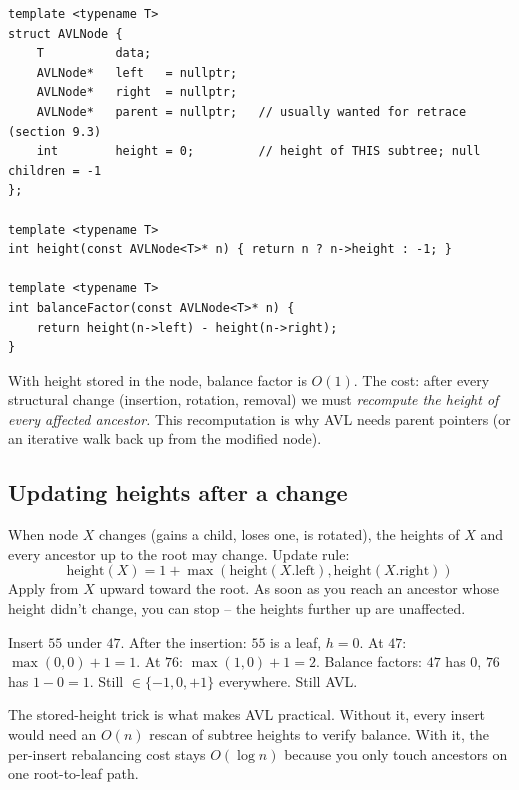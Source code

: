 \documentclass[11pt]{article}
\begin{document}
\begin{lstlisting}
template <typename T>
struct AVLNode {
    T          data;
    AVLNode*   left   = nullptr;
    AVLNode*   right  = nullptr;
    AVLNode*   parent = nullptr;   // usually wanted for retrace (section 9.3)
    int        height = 0;         // height of THIS subtree; null children = -1
};

template <typename T>
int height(const AVLNode<T>* n) { return n ? n->height : -1; }

template <typename T>
int balanceFactor(const AVLNode<T>* n) {
    return height(n->left) - height(n->right);
}
\end{lstlisting}

With height stored in the node, balance factor is $O(1)$. The cost: after every structural change (insertion, rotation, removal) we must \emph{recompute the height of every affected ancestor.} This recomputation is why AVL needs parent pointers (or an iterative walk back up from the modified node).

\subsection*{Updating heights after a change}

When node $X$ changes (gains a child, loses one, is rotated), the heights of $X$ and every ancestor up to the root may change. Update rule:
\[
\text{height}(X) = 1 + \max(\text{height}(X.\text{left}), \text{height}(X.\text{right}))
\]
Apply from $X$ upward toward the root. As soon as you reach an ancestor whose height didn't change, you can stop -- the heights further up are unaffected.

\begin{center}
\end{center}

Insert $55$ under $47$. After the insertion: $55$ is a leaf, $h=0$. At $47$: $\max(0, 0) + 1 = 1$. At $76$: $\max(1, 0) + 1 = 2$. Balance factors: $47$ has $0$, $76$ has $1 - 0 = 1$. Still $\in \{-1, 0, +1\}$ everywhere. Still AVL.

\begin{ideabox}
The stored-height trick is what makes AVL practical. Without it, every insert would need an $O(n)$ rescan of subtree heights to verify balance. With it, the per-insert rebalancing cost stays $O(\log n)$ because you only touch ancestors on one root-to-leaf path.
\end{ideabox}
\end{document}
